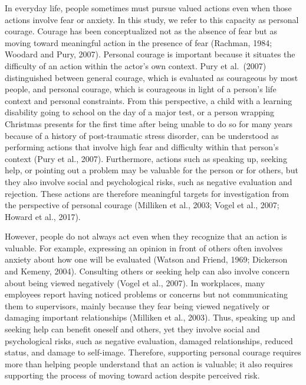 In everyday life, people sometimes must pursue valued actions even when
those actions involve fear or anxiety. In this study, we refer to this
capacity as personal courage. Courage has been conceptualized not as the
absence of fear but as moving toward meaningful action in the presence
of fear (Rachman, 1984; Woodard and Pury, 2007). Personal courage is
important because it situates the difficulty of an action within the
actor's own context. Pury et al.~(2007) distinguished between general
courage, which is evaluated as courageous by most people, and personal
courage, which is courageous in light of a person's life context and
personal constraints. From this perspective, a child with a learning
disability going to school on the day of a major test, or a person
wrapping Christmas presents for the first time after being unable to do
so for many years because of a history of post-traumatic stress
disorder, can be understood as performing actions that involve high fear
and difficulty within that person's context (Pury et al., 2007).
Furthermore, actions such as speaking up, seeking help, or pointing out
a problem may be valuable for the person or for others, but they also
involve social and psychological risks, such as negative evaluation and
rejection. These actions are therefore meaningful targets for
investigation from the perspective of personal courage (Milliken et al.,
2003; Vogel et al., 2007; Howard et al., 2017).

However, people do not always act even when they recognize that an
action is valuable. For example, expressing an opinion in front of
others often involves anxiety about how one will be evaluated (Watson
and Friend, 1969; Dickerson and Kemeny, 2004). Consulting others or
seeking help can also involve concern about being viewed negatively
(Vogel et al., 2007). In workplaces, many employees report having
noticed problems or concerns but not communicating them to supervisors,
mainly because they fear being viewed negatively or damaging important
relationships (Milliken et al., 2003). Thus, speaking up and seeking
help can benefit oneself and others, yet they involve social and
psychological risks, such as negative evaluation, damaged relationships,
reduced status, and damage to self-image. Therefore, supporting personal
courage requires more than helping people understand that an action is
valuable; it also requires supporting the process of moving toward
action despite perceived risk.

